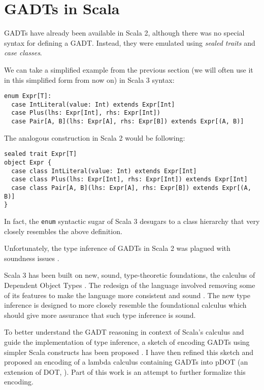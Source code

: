\section{GADTs in Scala}

GADTs have already been available in Scala 2, although there was no special syntax for defining a GADT. Instead, they were emulated using \textit{sealed traits} and \textit{case classes}.

We can take a simplified example from the previous section (we will often use it in this simplified form from now on) in Scala 3 syntax:

\begin{verbatim}
enum Expr[T]:
  case IntLiteral(value: Int) extends Expr[Int]
  case Plus(lhs: Expr[Int], rhs: Expr[Int])
  case Pair[A, B](lhs: Expr[A], rhs: Expr[B]) extends Expr[(A, B)]
\end{verbatim}

The analogous construction in Scala 2 would be following:

\begin{verbatim}
sealed trait Expr[T]
object Expr {
  case class IntLiteral(value: Int) extends Expr[Int]
  case class Plus(lhs: Expr[Int], rhs: Expr[Int]) extends Expr[Int]
  case class Pair[A, B](lhs: Expr[A], rhs: Expr[B]) extends Expr[(A, B)]
}
\end{verbatim}

In fact, the \texttt{enum} syntactic sugar of Scala 3 desugars to a class hierarchy that very closely resembles the above definition.

Unfortunately, the type inference of GADTs in Scala 2 was plagued with soundness issues \cite{Towards}. 

Scala 3 has been built on new, sound, type-theoretic foundations, the calculus of Dependent Object Types \cite{EssenceDOT}. The redesign of the language involved removing some of its features to make the language more consistent and sound . The new type inference is designed to more closely resemble the foundational calculus which should give more assurance that such type inference is sound.

To better understand the GADT reasoning in context of Scala's calculus and guide the implementation of type inference, a sketch of encoding GADTs using simpler Scala constructs has been proposed \cite{Towards}. I have then refined this sketch and proposed an encoding \cite{myreport:277075}  of a lambda calculus containing GADTs into pDOT (an extension of DOT, \cite{pDOT}). Part of this work is an attempt to further formalize this encoding.


